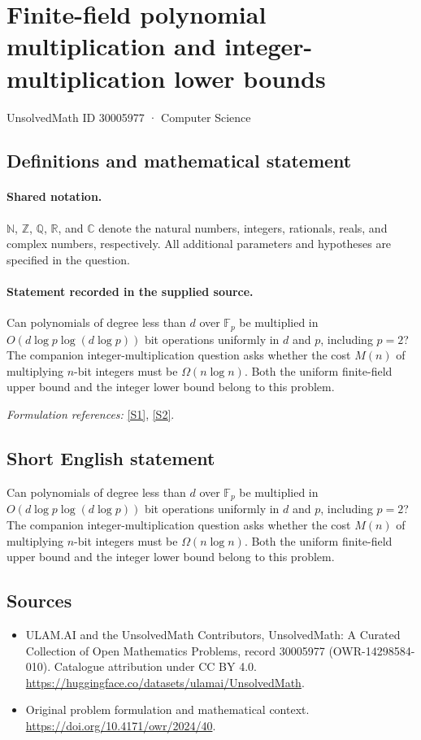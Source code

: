 \documentclass[11pt]{article}
\newcommand{\sref}[2]{\hyperlink{source:#1:#2}{[S#2]}}
\begin{document}
\setcounter{section}{30005976}
\section{Finite-field polynomial multiplication and integer-multiplication lower bounds}\label{30005977}
{\small UnsolvedMath ID 30005977 · Computer Science}
\subsection{Definitions and mathematical statement}

\paragraph{Shared notation.}$\mathbb N$, $\mathbb Z$, $\mathbb Q$, $\mathbb R$, and $\mathbb C$ denote the natural numbers, integers, rationals, reals, and complex numbers, respectively. All additional parameters and hypotheses are specified in the question.


\paragraph{Statement recorded in the supplied source.}
Can polynomials of degree less than $d$ over $\mathbb F_p$ be multiplied in $O(d\log p\log(d\log p))$ bit operations uniformly in $d$ and $p$, including $p=2$? The companion integer-multiplication question asks whether the cost $M(n)$ of multiplying $n$-bit integers must be $\Omega(n\log n)$. Both the uniform finite-field upper bound and the integer lower bound belong to this problem.
\par\smallskip\textit{Formulation references:} \sref{30005977}{1}, \sref{30005977}{2}.
\subsection{Short English statement}
Can polynomials of degree less than $d$ over $\mathbb F_p$ be multiplied in $O(d\log p\log(d\log p))$ bit operations uniformly in $d$ and $p$, including $p=2$? The companion integer-multiplication question asks whether the cost $M(n)$ of multiplying $n$-bit integers must be $\Omega(n\log n)$. Both the uniform finite-field upper bound and the integer lower bound belong to this problem.
\subsection{Sources}
\begin{itemize}
\item[\hypertarget{source:30005977:1}{S1}] ULAM.AI and the UnsolvedMath Contributors, UnsolvedMath: A Curated Collection of Open Mathematics Problems, record 30005977 (OWR-14298584-010). Catalogue attribution under CC BY 4.0.
\url{https://huggingface.co/datasets/ulamai/UnsolvedMath}.
\item[\hypertarget{source:30005977:2}{S2}] Original problem formulation and mathematical context.
\url{https://doi.org/10.4171/owr/2024/40}.
\end{itemize}
\label{end:30005977}
\end{document}
